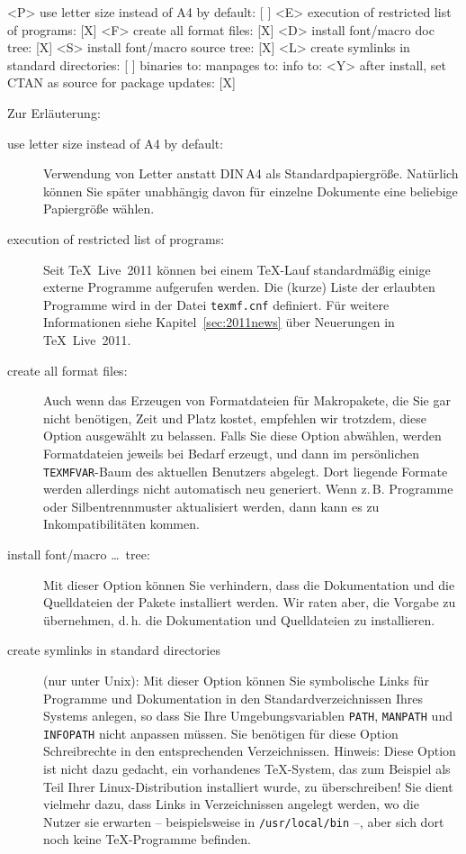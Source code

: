 \documentclass[12pt,ngerman,a4paper,fullparskip]{scrreprt}
\newcommand{\TL}{\TeX\ Live\xspace}
\newcommand{\filename}[1]{\texttt{#1}}
\newcommand{\dirname}[1]{\texttt{#1}}
\newcommand{\envname}[1]{\texttt{#1}}
\begin{document}
\begin{boxedverbatim}
 <P> use letter size instead of A4 by default: [ ]
 <E> execution of restricted list of programs: [X]
 <F> create all format files:                  [X]
 <D> install font/macro doc tree:              [X]
 <S> install font/macro source tree:           [X]
 <L> create symlinks in standard directories:  [ ]
            binaries to:
            manpages to:
                info to:
 <Y> after install, set CTAN as source for package updates: [X]
\end{boxedverbatim}


 Zur Erläuterung:
\begin{description}
\item[use letter size instead of A4 by default:] Verwendung von Letter anstatt DIN\,A4 als
Standard\-papier\-größe. Natürlich können Sie später unabhängig davon für einzelne Dokumente eine
beliebige Papiergröße wählen.

\item[execution of restricted list of programs:] Seit \TL\ 2011 können bei einem
\TeX-Lauf standardmäßig einige externe Programme aufgerufen werden. Die (kurze) 
Liste der erlaubten Programme wird in der Datei \filename{texmf.cnf} definiert.
Für weitere Informationen siehe Kapitel~\ref{sec:2011news} über Neuerungen in 
\TL\ 2011.

\item[create all format files:] Auch wenn das Erzeugen von Formatdateien für Makropakete, die Sie gar nicht benötigen, Zeit und Platz kostet, empfehlen wir trotzdem, diese Option ausgewählt zu belassen.  Falls Sie diese Option abwählen, werden Formatdateien jeweils bei Bedarf erzeugt, und dann im persönlichen \dirname{TEXMFVAR}-Baum des aktuellen Benutzers abgelegt. Dort liegende Formate werden allerdings nicht automatisch neu generiert. Wenn z.\,B. Programme oder Silbentrennmuster aktualisiert werden, dann kann es zu Inkompatibilitäten kommen. 

\item[install font/macro \ldots\ tree:] Mit dieser Option können Sie  verhindern, dass die Dokumentation und die Quelldateien der Pakete  installiert werden. Wir raten aber, die Vorgabe zu übernehmen, d.\,h. die Dokumentation und Quelldateien zu installieren.

\item[create symlinks in standard directories] (nur unter Unix):
  Mit dieser Option können Sie symbolische Links für Programme und Dokumentation in den Standard\-verzeichnissen   Ihres Systems anlegen, so dass Sie Ihre Umgebungsvariablen \envname{PATH}, \envname{MANPATH} und \envname{INFOPATH} nicht anpassen müssen. Sie benötigen für diese Option Schreibrechte in den entsprechenden Verzeichnissen. Hinweis: Diese Option ist nicht dazu gedacht, ein vorhandenes \TeX-System, das zum Beispiel als Teil Ihrer Linux-Distribution installiert wurde, zu überschreiben! Sie dient vielmehr dazu, dass Links in Verzeichnissen angelegt werden, wo die Nutzer sie erwarten -- beispielsweise in \dirname{/usr/local/bin} --, aber sich dort noch keine \TeX-Programme befinden.


\end{description}
\end{document}
